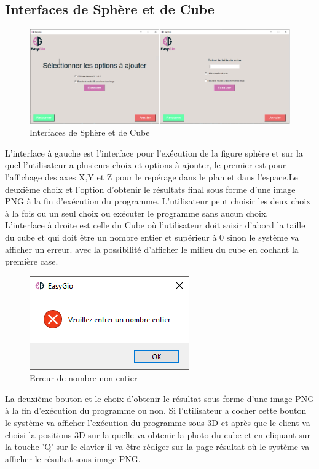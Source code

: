 \documentclass[a4paper]{report}
\begin{document}
\subsection{Interfaces de Sphère et de Cube}
\begin{figure}[!h]
    \centering
    \includegraphics[width=15cm]{images/SpCube.PNG}
    \caption{Interfaces de Sphère et de Cube}
    \label{fig:Interfaces de Sphère et de Cube}
\end{figure}
L'interface à gauche est l'interface pour l'exécution de la figure sphère et sur la quel l'utilisateur a plusieurs choix et options à ajouter, le premier est pour l'affichage des axes X,Y et Z pour le repérage dans le plan et dans l'espace.Le deuxième choix et l'option d'obtenir le résultats final sous forme d'une image PNG à la fin d'exécution du programme. L'utilisateur peut choisir les deux choix à la fois ou un seul choix ou exécuter le programme sans aucun choix.\\
L'interface à droite est celle du Cube où l'utilisateur doit saisir d'abord la taille du cube et qui doit être un nombre entier et supérieur à 0 sinon le système va afficher un erreur. avec la possibilité d'afficher le milieu du cube en cochant la première case.\\
\begin{figure}[!h]
    \centering
    \includegraphics{images/NbError.PNG}
    \caption{Erreur de nombre non entier}
    \label{fig:Erreur de nombre non entier}
\end{figure}
\newpage
La deuxième bouton et le choix d'obtenir le résultat sous forme d'une image PNG à la fin d'exécution du programme ou non. Si l'utilisateur a cocher cette bouton le système va afficher l'exécution du programme sous 3D et après que le client va choisi la positions 3D sur la quelle va obtenir la photo du cube et en cliquant sur la touche 'Q' sur le clavier il va être rédiger sur la page résultat où le système va afficher le résultat sous image PNG.\\
\end{document}

